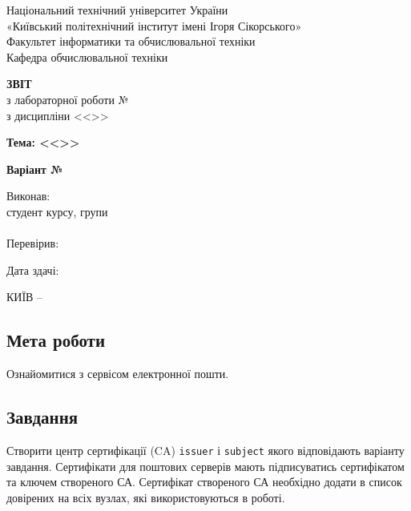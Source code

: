 \documentclass[14pt, a4paper]{extreport}
\begin{document}
	
	\begin{titlepage}
		\begin{center}
			\normalsize
			Національний технічний університет України\\
			«Київський політехнічний інститут імені Ігоря Сікорського» \\[0.5em]
			Факультет інформатики та обчислювальної техніки\\
			Кафедра обчислювальної техніки
			
			\vfill
			
			{\large \textbf{ЗВІТ}\\[0.5em]}
			{з лабораторної роботи №\LabNumber \\}
			{з дисципліни <<\CourseTitle>>}
			
			\vspace{2em}
			
			{\textbf{Тема: <<\Topic>>}}
			
			\vspace{1em}
			
			{\textbf{Варіант №\Variant}}
			
			\vfill
			
			\begin{flushright}
				Виконав: \\ студент \CourseNumber{} курсу, групи \StudentGroup \\
				\StudentName \\[1em]
				Перевірив: \\ \Teacher
			\end{flushright}
			
			\vfill
			
			\begin{flushright}
				Дата здачі: \DTMtoday
			\end{flushright}
			
			\vspace{5em}
			КИЇВ -- \ReportYear
		\end{center}
	\end{titlepage}
	
	\clearpage
	\setcounter{page}{2}
	
	\subsection*{Мета роботи} 
	Ознайомитися з сервісом електронної пошти.
	
	\subsection*{Завдання}
	Створити центр сертифікації (CA) \texttt{issuer} і \texttt{subject} якого відповідають варіанту завдання. Сертифікати для поштових серверів мають підписуватись сертифікатом та ключем створеного СА. Сертифікат створеного СА необхідно додати в список довірених на всіх вузлах, які використовуються в роботі.
	
\end{document}
